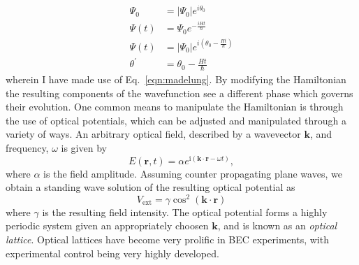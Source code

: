 {\begin{subequations}
\begin{align}
    \Psi_0 &= |\Psi_0|e^{i\theta_0} \\
    \Psi(t) &= \Psi_0 e^{-\frac{i H t}{\hbar}} \\
    \Psi(t) &= |\Psi_0| e^{i\left(\theta_0 - \frac{H t}{\hbar}\right)} \\
    \theta^{'} &= \theta_0 - \frac{H t}{\hbar}
\end{align}
\end{subequations}
wherein I have made use of Eq.~\ref{eqn:madelung}. By modifying the Hamiltonian the resulting components of the wavefunction see a different phase which governs their evolution. One common means to manipulate the Hamiltonian is through the use of optical potentials, which can be adjusted and manipulated through a variety of ways. An arbitrary optical field, described by a wavevector $\mathbf{k}$, and frequency, $\omega$ is given by
\begin{equation}
    E(\mathbf{r},t) = \alpha e^{\textrm{i}\left(\mathbf{k}\cdot\mathbf{r} - \omega t\right)},
\end{equation}
where $\alpha$ is the field amplitude. Assuming counter propagating plane waves, we obtain a standing wave solution of the resulting optical potential as
\begin{equation}
    V_{\textrm{ext}} = \gamma \cos^2 (\mathbf{k} \cdot \mathbf{r})
\end{equation}
where $\gamma$ is the resulting field intensity. The optical potential forms a highly periodic system given an appropriately choosen $\mathbf{k}$, and is known as an \textit{optical lattice}. Optical lattices have become very prolific in BEC experiments, with experimental control being very highly developed.

}
